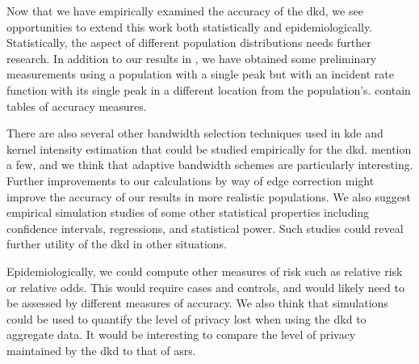 

Now that we have empirically examined the accuracy of the \gls{dkd},
we see opportunities to extend this work both statistically and epidemiologically.
Statistically,
the aspect of different population distributions needs further research.
In addition to our results in ,
we have obtained some preliminary measurements using a population with a single peak
but with an incident rate function with its single peak in a different location from the population's.
 contain tables of accuracy measures.

There are also several other bandwidth selection techniques used in \gls{kde}
and \gls{kernel intensity estimation} that could be studied empirically for the \gls{dkd}.
\citet{silverman1986density,wand1994kernel} mention a few,
and we think that adaptive bandwidth schemes are particularly interesting.
Further improvements to our calculations by way of edge correction might improve the accuracy of our results in more realistic populations.
We also suggest empirical simulation studies of some other statistical properties  
including confidence intervals, regressions, and statistical power.
Such studies could reveal further utility of the \gls{dkd} in other situations.

Epidemiologically,
we could compute other measures of risk such as relative risk or relative odds.
This would require cases and controls,
and would likely need to be assessed by different measures of accuracy.
We also think that simulations could be used to quantify the level of privacy lost when using the \gls{dkd} to aggregate data.
It would be interesting to compare the level of privacy maintained by the \gls{dkd} to that of \glspl{asr}.
